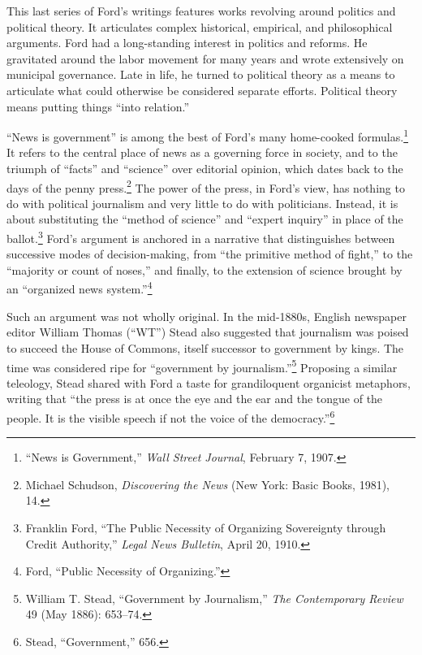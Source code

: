 \documentclass[openany,nobib]{tufte-book}
\begin{document}
This last series of Ford's writings features works revolving around
politics and political theory. It articulates complex historical,
empirical, and philosophical arguments. Ford had a long-standing
interest in politics and reforms. He gravitated around the labor
movement for many years and wrote extensively on municipal governance.
Late in life, he turned to political theory as a means to articulate
what could otherwise be considered separate efforts. Political theory
means putting things ``into relation.''

``News is government'' is among the best of Ford's many home-cooked
formulas.\footnote{``News is Government,'' \emph{Wall Street Journal},
  February 7, 1907.} It refers to the central place of news as a
governing force in society, and to the triumph of ``facts'' and
``science'' over editorial opinion, which dates back to the days of the
penny press.\footnote{Michael Schudson, \emph{Discovering the News} (New
  York: Basic Books, 1981), 14.} The power of the press, in Ford's view,
has nothing to do with political journalism and very little to do with
politicians. Instead, it is about substituting the ``method of science''
and ``expert inquiry'' in place of the ballot.\footnote{Franklin Ford,
  ``The Public Necessity of Organizing Sovereignty through Credit
  Authority,'' \emph{Legal News Bulletin}, April 20, 1910.} Ford's
argument is anchored in a narrative that distinguishes between
successive modes of decision-making, from ``the primitive method of
fight,'' to the ``majority or count of noses,'' and finally, to the
extension of science brought by an ``organized news system.''\footnote{Ford,
  ``Public Necessity of Organizing.''}

Such an argument was not wholly original. In the mid-1880s, English
newspaper editor William Thomas (``WT'') Stead also suggested that
journalism was poised to succeed the House of Commons, itself successor
to government by kings. The time was considered ripe for ``government by
journalism.''\footnote{William T. Stead, ``Government by Journalism,''
  \emph{The Contemporary Review} 49 (May 1886): 653--74.} Proposing a
similar teleology, Stead shared with Ford a taste for grandiloquent
organicist metaphors, writing that ``the press is at once the eye and
the ear and the tongue of the people. It is the visible speech if not
the voice of the democracy.''\footnote{Stead, ``Government,'' 656.}
\end{document}
